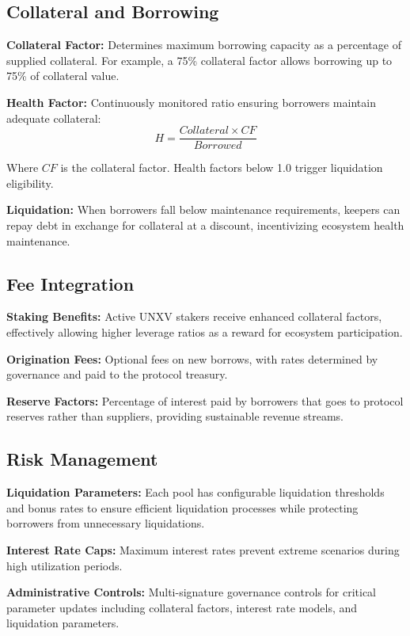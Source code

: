 \documentclass[12pt]{article}
\begin{document}
\subsection{Collateral and Borrowing}

\textbf{Collateral Factor:} Determines maximum borrowing capacity as a percentage of supplied collateral. For example, a 75\% collateral factor allows borrowing up to 75\% of collateral value.

\textbf{Health Factor:} Continuously monitored ratio ensuring borrowers maintain adequate collateral:
$$H = \frac{Collateral \times CF}{Borrowed}$$

Where $CF$ is the collateral factor. Health factors below 1.0 trigger liquidation eligibility.

\textbf{Liquidation:} When borrowers fall below maintenance requirements, keepers can repay debt in exchange for collateral at a discount, incentivizing ecosystem health maintenance.

\subsection{Fee Integration}

\textbf{Staking Benefits:} Active UNXV stakers receive enhanced collateral factors, effectively allowing higher leverage ratios as a reward for ecosystem participation.

\textbf{Origination Fees:} Optional fees on new borrows, with rates determined by governance and paid to the protocol treasury.

\textbf{Reserve Factors:} Percentage of interest paid by borrowers that goes to protocol reserves rather than suppliers, providing sustainable revenue streams.

\subsection{Risk Management}

\textbf{Liquidation Parameters:} Each pool has configurable liquidation thresholds and bonus rates to ensure efficient liquidation processes while protecting borrowers from unnecessary liquidations.

\textbf{Interest Rate Caps:} Maximum interest rates prevent extreme scenarios during high utilization periods.

\textbf{Administrative Controls:} Multi-signature governance controls for critical parameter updates including collateral factors, interest rate models, and liquidation parameters.
\end{document}
